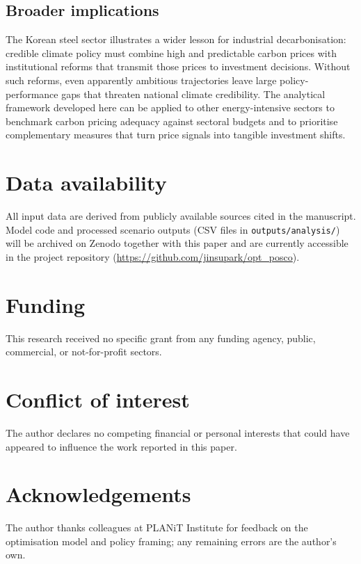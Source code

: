 \documentclass[preprint,1p,authoryear]{elsarticle}
\begin{document}
\subsection{Broader implications}

The Korean steel sector illustrates a wider lesson for industrial decarbonisation: credible climate policy must combine high and predictable carbon prices with institutional reforms that transmit those prices to investment decisions. Without such reforms, even apparently ambitious trajectories leave large policy-performance gaps that threaten national climate credibility. The analytical framework developed here can be applied to other energy-intensive sectors to benchmark carbon pricing adequacy against sectoral budgets and to prioritise complementary measures that turn price signals into tangible investment shifts.







\section*{Data availability}
All input data are derived from publicly available sources cited in the manuscript. Model code and processed scenario outputs (CSV files in \texttt{outputs/analysis/}) will be archived on Zenodo together with this paper and are currently accessible in the project repository (\url{https://github.com/jinsupark/opt\_posco}).

\section*{Funding}
This research received no specific grant from any funding agency, public, commercial, or not-for-profit sectors.

\section*{Conflict of interest}
The author declares no competing financial or personal interests that could have appeared to influence the work reported in this paper.

\section*{Acknowledgements}
The author thanks colleagues at PLANiT Institute for feedback on the optimisation model and policy framing; any remaining errors are the author’s own.
\end{document}
